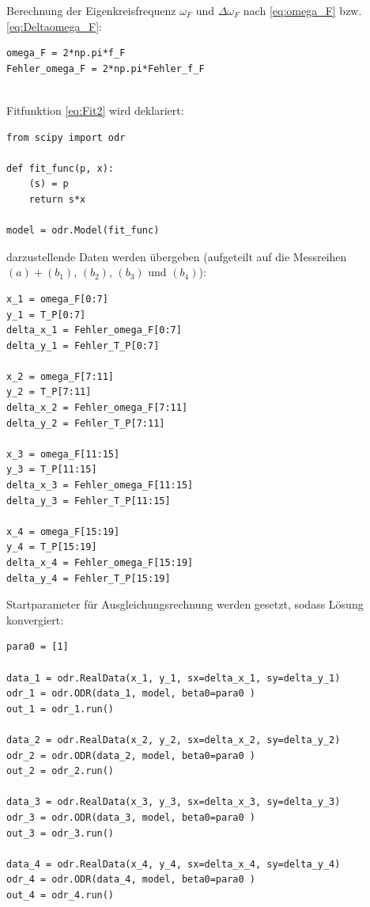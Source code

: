 \documentclass[a4paper,10pt]{article}
\begin{document}
Berechnung der Eigenkreisfrequenz  \(\omega_F\) und \(\Delta\omega_F\) nach \eqref{eq:omega_F} bzw. \eqref{eq:Deltaomega_F}:\begin{lstlisting}
omega_F = 2*np.pi*f_F
Fehler_omega_F = 2*np.pi*Fehler_f_F
                  
\end{lstlisting}

 Fitfunktion \eqref{eq:Fit2} wird deklariert:\begin{lstlisting}
from scipy import odr

def fit_func(p, x):
    (s) = p 
    return s*x

model = odr.Model(fit_func)

\end{lstlisting}

darzustellende Daten werden übergeben (aufgeteilt auf die Messreihen \((a)+(b_1)\), \((b_2)\), \((b_3)\) und \((b_4)\)):\begin{lstlisting}
x_1 = omega_F[0:7]
y_1 = T_P[0:7]
delta_x_1 = Fehler_omega_F[0:7]
delta_y_1 = Fehler_T_P[0:7]

x_2 = omega_F[7:11]
y_2 = T_P[7:11]
delta_x_2 = Fehler_omega_F[7:11]
delta_y_2 = Fehler_T_P[7:11]

x_3 = omega_F[11:15]
y_3 = T_P[11:15]
delta_x_3 = Fehler_omega_F[11:15]
delta_y_3 = Fehler_T_P[11:15]

x_4 = omega_F[15:19]
y_4 = T_P[15:19]
delta_x_4 = Fehler_omega_F[15:19]
delta_y_4 = Fehler_T_P[15:19]

\end{lstlisting}

Startparameter für Ausgleichungsrechnung werden gesetzt, sodass Lösung konvergiert:\begin{lstlisting}
para0 = [1]

data_1 = odr.RealData(x_1, y_1, sx=delta_x_1, sy=delta_y_1)
odr_1 = odr.ODR(data_1, model, beta0=para0 )
out_1 = odr_1.run()

data_2 = odr.RealData(x_2, y_2, sx=delta_x_2, sy=delta_y_2)
odr_2 = odr.ODR(data_2, model, beta0=para0 )
out_2 = odr_2.run()

data_3 = odr.RealData(x_3, y_3, sx=delta_x_3, sy=delta_y_3)
odr_3 = odr.ODR(data_3, model, beta0=para0 )
out_3 = odr_3.run()

data_4 = odr.RealData(x_4, y_4, sx=delta_x_4, sy=delta_y_4)
odr_4 = odr.ODR(data_4, model, beta0=para0 )
out_4 = odr_4.run()

\end{lstlisting}
\end{document}
